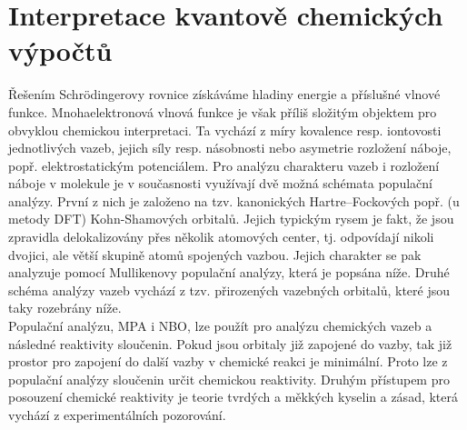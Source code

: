 \documentclass[
  digital, %
  table,   %
  lof,     %
  lot,     %
  oneside,
]{fithesis3}
\begin{document}
\section{Interpretace kvantově chemických výpočtů}
Řešením Schrödingerovy rovnice získáváme hladiny energie a příslušné vlnové funkce. Mnohaelektronová vlnová funkce je však příliš složitým objektem pro obvyklou chemickou interpretaci. Ta vychází z míry kovalence resp. iontovosti jednotlivých vazeb, jejich síly resp. násobnosti nebo asymetrie rozložení náboje, popř. elektrostatickým potenciálem. Pro analýzu charakteru vazeb i rozložení náboje v molekule je v současnosti využívají dvě možná schémata populační analýzy. První z nich je založeno na tzv. kanonických Hartre--Fockových popř. (u metody DFT) Kohn-Shamových orbitalů. Jejich typickým rysem je fakt, že jsou zpravidla delokalizovány přes několik atomových center, tj. odpovídají nikoli dvojici, ale větší skupině atomů spojených vazbou. Jejich charakter se pak analyzuje pomocí Mullikenovy populační analýzy, která je popsána níže. Druhé schéma analýzy vazeb vychází z tzv. přirozených vazebných orbitalů, které jsou taky rozebrány níže. \\
Populační analýzu, MPA i NBO, lze použít pro analýzu chemických vazeb a následné reaktivity sloučenin. Pokud jsou orbitaly již zapojené do vazby, tak již prostor pro zapojení do další vazby v chemické reakci je minimální. Proto lze z populační analýzy sloučenin určit chemickou reaktivity. Druhým přístupem pro posouzení chemické reaktivity je teorie tvrdých a měkkých kyselin a zásad, která vychází z experimentálních pozorování.
\end{document}
